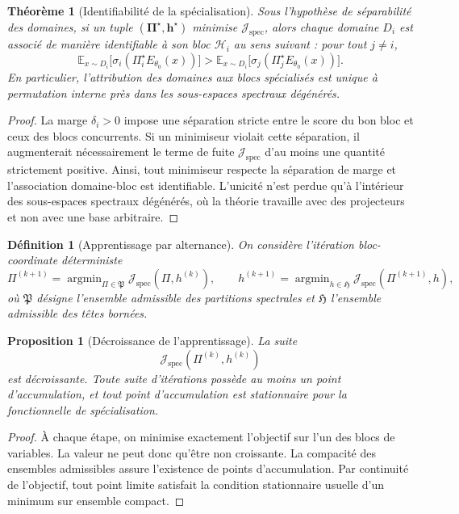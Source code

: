 \documentclass[11pt,a4paper]{article}
\newtheorem{definition}{Définition}[section]
\newtheorem{proposition}{Proposition}[section]
\newtheorem{theorem}{Théorème}[section]
\DeclareMathOperator{\argmin}{argmin}
\newcommand{\Hh}{\mathcal H}
\newcommand{\1}{\mathbf 1}
\begin{document}
\begin{theorem}[Identifiabilité de la spécialisation]
Sous l'hypothèse de séparabilité des domaines, si un tuple \((\mathbf \Pi^\star,\mathbf h^\star)\) minimise \(\mathcal J_{\mathrm{spec}}\), alors chaque domaine \(D_i\) est associé de manière identifiable à son bloc \(\Hh_i\) au sens suivant :
pour tout \(j\neq i\),
\[
\mathbb E_{x\sim D_i}\bigl[\sigma_i(\Pi_i^\star E_{\theta_0}(x))\bigr]
>
\mathbb E_{x\sim D_i}\bigl[\sigma_j(\Pi_j^\star E_{\theta_0}(x))\bigr].
\]
En particulier, l'attribution des domaines aux blocs spécialisés est unique à permutation interne près dans les sous-espaces spectraux dégénérés.
\end{theorem}

\begin{proof}
La marge \(\delta_i>0\) impose une séparation stricte entre le score du bon bloc et ceux des blocs concurrents.  
Si un minimiseur violait cette séparation, il augmenterait nécessairement le terme de fuite \(\mathcal J_{\mathrm{spec}}\) d'au moins une quantité strictement positive.  
Ainsi, tout minimiseur respecte la séparation de marge et l'association domaine-bloc est identifiable.  
L'unicité n'est perdue qu'à l'intérieur des sous-espaces spectraux dégénérés, où la théorie travaille avec des projecteurs et non avec une base arbitraire.
\end{proof}

\begin{definition}[Apprentissage par alternance]
On considère l'itération bloc-coordinate déterministe
\[
\Pi^{(k+1)}
=
\argmin_{\Pi\in\mathfrak P}\mathcal J_{\mathrm{spec}}(\Pi,h^{(k)}),
\qquad
h^{(k+1)}
=
\argmin_{h\in\mathfrak H}\mathcal J_{\mathrm{spec}}(\Pi^{(k+1)},h),
\]
où \(\mathfrak P\) désigne l'ensemble admissible des partitions spectrales et \(\mathfrak H\) l'ensemble admissible des têtes bornées.
\end{definition}

\begin{proposition}[Décroissance de l'apprentissage]
La suite
\[
\mathcal J_{\mathrm{spec}}(\Pi^{(k)},h^{(k)})
\]
est décroissante.  
Toute suite d'itérations possède au moins un point d'accumulation, et tout point d'accumulation est stationnaire pour la fonctionnelle de spécialisation.
\end{proposition}

\begin{proof}
À chaque étape, on minimise exactement l'objectif sur l'un des blocs de variables.  
La valeur ne peut donc qu'être non croissante.  
La compacité des ensembles admissibles assure l'existence de points d'accumulation.  
Par continuité de l'objectif, tout point limite satisfait la condition stationnaire usuelle d'un minimum sur ensemble compact.
\end{proof}
\end{document}
